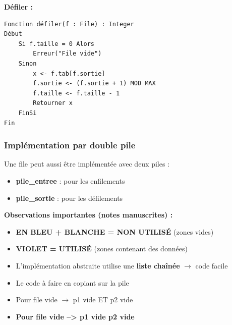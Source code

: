 \documentclass[12pt,a4paper]{article}
\begin{document}
\begin{algorithme}
\textbf{Défiler :}
\begin{verbatim}
Fonction défiler(f : File) : Integer
Début
    Si f.taille = 0 Alors
        Erreur("File vide")
    Sinon
        x <- f.tab[f.sortie]
        f.sortie <- (f.sortie + 1) MOD MAX
        f.taille <- f.taille - 1
        Retourner x
    FinSi
Fin
\end{verbatim}
\end{algorithme}

\subsubsection{Implémentation par double pile}

\begin{important}
Une file peut aussi être implémentée avec deux piles :
\begin{itemize}
    \item \textbf{pile\_entree} : pour les enfilements
    \item \textbf{pile\_sortie} : pour les défilements
\end{itemize}
\end{important}

\begin{notecours}
\textbf{Observations importantes (notes manuscrites) :}
\begin{itemize}
    \item \textbf{EN BLEU + BLANCHE = NON UTILISÉ} (zones vides)
    \item \textbf{VIOLET = UTILISÉ} (zones contenant des données)
    \item L'implémentation abstraite utilise une \textbf{liste chaînée} $\rightarrow$ code facile
    \item Le code à faire en copiant sur la pile
    \item Pour file vide $\rightarrow$ p1 vide ET p2 vide
    \item \textbf{Pour file vide --> p1 vide p2 vide}
\end{itemize}
\end{notecours}
\end{document}
